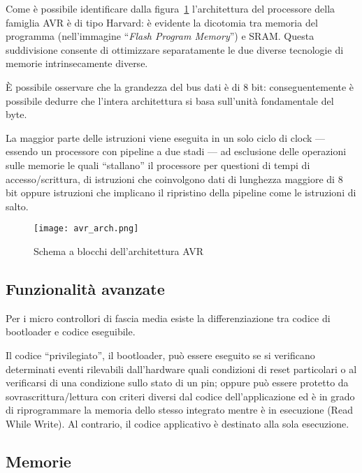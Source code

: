 Come è possibile identificare dalla figura~\ref{fig:avr-arch} l'architettura del processore della famiglia AVR è di tipo Harvard: è evidente la dicotomia tra memoria del programma (nell'immagine ``\textit{Flash Program Memory}'') e SRAM\cite{harvard-arch}. Questa suddivisione consente di ottimizzare separatamente le due diverse tecnologie di memorie intrinsecamente diverse.

È possibile osservare che la grandezza del bus dati è di 8 bit: conseguentemente è possibile dedurre che l'intera architettura si basa sull'unità fondamentale del byte.

La maggior parte delle istruzioni viene eseguita in un solo ciclo di clock\cite[sec 7.6]{avr:m328p} --- essendo un processore con pipeline a due stadi --- ad esclusione delle operazioni sulle memorie le quali ``stallano'' il processore per questioni di tempi di accesso/scrittura, di istruzioni che coinvolgono dati di lunghezza maggiore di 8 bit oppure istruzioni che implicano il ripristino della pipeline come le istruzioni di salto.

\begin{figure}[t]
    \centering
    \texttt{[image: avr\_arch.png]}
    \caption[Immagine ottenuta dal documento~\cite{avr:m328p} fig 7-1]{Schema a blocchi dell'architettura AVR\cite[fig 7-1]{avr:m328p}}\label{fig:avr-arch}
\end{figure}

\subsection{Funzionalità avanzate}\label{ss:advanced-features}

Per i micro controllori di fascia media esiste la differenziazione tra codice di bootloader e codice eseguibile.

Il codice ``privilegiato'', il bootloader, può essere eseguito se si verificano determinati eventi rilevabili dall'hardware quali condizioni di reset particolari o al verificarsi di una condizione sullo stato di un pin; oppure può essere protetto da sovrascrittura/lettura con criteri diversi dal codice dell'applicazione ed è in grado di riprogrammare la memoria dello stesso integrato mentre è in esecuzione (Read While Write)\cite[sec 27.4]{avr:m328p}. Al contrario, il codice applicativo è destinato alla sola esecuzione.

\subsection{Memorie}

